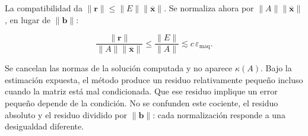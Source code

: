 \documentclass[12pt,a4paper]{article}
\begin{document}
La compatibilidad da $\|\mathbf r\|\le\|E\|\|\overline{\mathbf x}\|$. Se normaliza ahora por $\|A\|\|\overline{\mathbf x}\|$, en lugar de $\|\mathbf b\|$:

\[
\boxed{\frac{\|\mathbf r\|}{\|A\|\|\overline{\mathbf x}\|}
\le\frac{\|E\|}{\|A\|}
\lesssim c\,\varepsilon_{\mathrm{maq}}}.
\]

Se cancelan las normas de la solución computada y no aparece $\kappa(A)$. Bajo la estimación expuesta, el método produce un residuo relativamente pequeño incluso cuando la matriz está mal condicionada. Que ese residuo implique un error pequeño depende de la condición. No se confunden este cociente, el residuo absoluto y el residuo dividido por $\|\mathbf b\|$: cada normalización responde a una desigualdad diferente.
\end{document}
